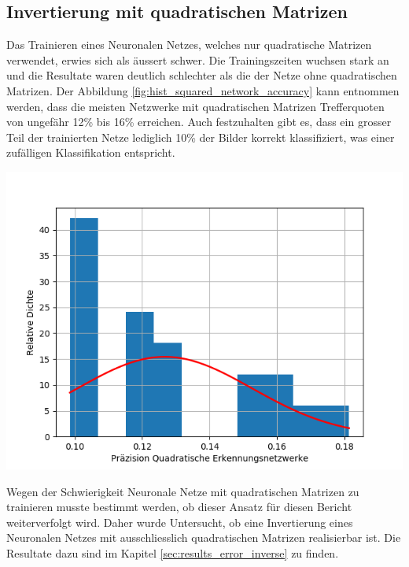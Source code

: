 \documentclass[Interploate_hadwritten_Digits.tex]{subfiles}
\begin{document}
	\subsection{Invertierung mit quadratischen Matrizen}
	Das Trainieren eines Neuronalen Netzes, welches nur quadratische Matrizen verwendet, erwies sich als äussert schwer. Die Trainingszeiten wuchsen stark an und die Resultate waren deutlich schlechter als die der Netze ohne quadratischen Matrizen. Der Abbildung \ref{fig:hist_squared_network_accuracy} kann entnommen werden, dass die meisten Netzwerke mit quadratischen Matrizen Trefferquoten von ungefähr 12\% bis 16\% erreichen. Auch festzuhalten gibt es, dass ein grosser Teil der trainierten Netze lediglich 10\% der Bilder korrekt klassifiziert, was einer zufälligen Klassifikation entspricht.
	\begin{Figure}
		\centering
		\includegraphics[width=\linewidth]{img/results/histogram_squared_network_accuracy.png}
		\label{fig:hist_squared_network_accuracy}
	\end{Figure}

	Wegen der Schwierigkeit Neuronale Netze mit quadratischen Matrizen zu trainieren musste bestimmt werden, ob dieser Ansatz für diesen Bericht weiterverfolgt wird. Daher wurde Untersucht, ob eine Invertierung eines Neuronalen Netzes mit ausschliesslich quadratischen Matrizen realisierbar ist.  Die Resultate dazu sind im Kapitel \ref{sec:results_error_inverse} zu finden.
	
\end{document}
